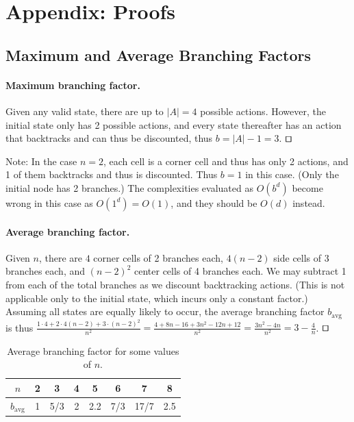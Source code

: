 \documentclass[runningheads]{llncs}
\begin{document}
\pagebreak
\appendix
\section{Appendix: Proofs}
\label{app:proofs}


\subsection{Maximum and Average Branching Factors}
\label{subsec:branchingfactors}
\paragraph{Maximum branching factor.} Given any valid state, there are up to $|A|=4$ possible actions. However, the initial state only has 2 possible actions, and every state thereafter has an action that backtracks and can thus be discounted, thus $b = |A|-1 = 3$. $\qed$

Note: In the case $n=2$, each cell is a corner cell and thus has only 2 actions, and 1 of them backtracks and thus is discounted. Thus $b = 1$ in this case. (Only the initial node has 2 branches.) The complexities evaluated as $O(b^d)$ become wrong in this case as $O(1^d) = O(1)$, and they should be $O(d)$ instead.

\paragraph{Average branching factor.} Given $n$, there are $4$ corner cells of 2 branches each, $4(n-2)$ side cells of 3 branches each, and $(n-2)^2$ center cells of 4 branches each. We may subtract 1 from each of the total branches as we discount backtracking actions. (This is not applicable only to the initial state, which incurs only a constant factor.) Assuming all states are equally likely to occur, the average branching factor $b_\text{avg}$ is thus $\frac{1\cdot 4 + 2\cdot 4(n-2) + 3\cdot (n-2)^2}{n^2} = \frac{4 + 8n - 16 + 3n^2 - 12n + 12}{n^2} = \frac{3n^2 - 4n}{n^2} = 3 - \frac{4}{n}$. $\qed$

\begin{table}[h]
\centering
\caption{Average branching factor for some values of $n$.}
\label{tab:results}
\begin{tabular}{|c||c|c|c|c|c|c|c|} \hline
$n$            & 2 & 3   & 4 & 5   & 6   &  7   & 8 \\ \hline
$b_\text{avg}$ & 1 & 5/3 & 2 & 2.2 & 7/3 & 17/7 & 2.5 \\ \hline
\end{tabular}
\end{table}
\end{document}
